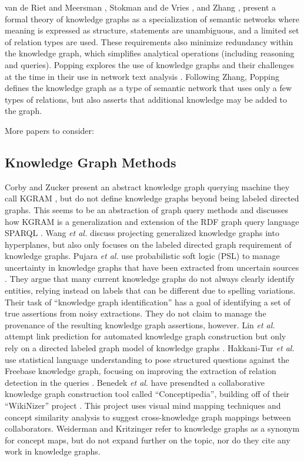 \documentclass[runningheads,a4paper]{llncs}
\begin{document}
van de Riet and Meersman \cite{van1992knowledge}, Stokman and de Vries \cite{Stokman_1988}, and Zhang \cite{zhang2002knowledge}, present a formal theory of knowledge graphs as a specialization of semantic networks where meaning is expressed as structure, statements are unambiguous, and a limited set of relation types are used.
These requirements also minimize redundancy within the knowledge graph, which simplifies analytical operations (including reasoning and queries).
Popping explores the use of knowledge graphs and their challenges at the time in their use in network text analysis \cite{Popping_2003}. 
Following Zhang, Popping defines the knowledge graph as a type of semantic network that uses only a few types of relations, but also asserts that additional knowledge may be added to the graph.

More papers to consider: \cite{Dieng_1992} \cite{Juel_Vang_2013}

\subsection{Knowledge Graph Methods}
Corby and Zucker present an abstract knowledge graph querying machine they call KGRAM \cite{Corby_2010}, but do not define knowledge graphs beyond being labeled directed graphs.
This seems to be an abstraction of graph query methods and discusses how KGRAM is a generalization and extension of the RDF graph query language SPARQL \cite{harris2013sparql}.
Wang \emph{et al.} \cite{Wang_knowledgegraph} discuss projecting generalized knowledge graphs into hyperplanes, but also only focuses on the labeled directed graph requirement of knowledge graphs.
Pujara \emph{et al.} use probabilistic soft logic (PSL) to manage uncertainty in knowledge graphs that have been extracted from uncertain sources \cite{Pujara_2013}. 
They argue that many current knowledge graphs do not always clearly identify entities, relying instead on labels that can be different due to spelling variations.
Their task of ``knowledge graph identification'' has a goal of identifying a set of true assertions from noisy extractions.
They do not claim to manage the provenance of the resulting knowledge graph assertions, however.
Lin \emph{et al.} attempt link prediction for automated knowledge graph construction but only rely on a directed labeled graph model of knowledge graphs \cite{lin2015learning}.
Hakkani-Tur \emph{et al.} use statistical language understanding to pose structured questions against the Freebase knowledge graph, focusing on improving the extraction of relation detection in the queries \cite{Hakkani_Tur_2013}.
Benedek \emph{et al.} have presendted a collaborative knowledge graph construction tool called  ``Conceptipedia'', building off of their ``WikiNizer'' project .
This project uses visual mind mapping techniques and concept similarity analysis to suggest cross-knowledge graph mappings between collaborators.
Weiderman and Kritzinger \cite{} refer to knowledge graphs as a synonym for concept maps, but do not expand further on the topic, nor do they cite any work in knowledge graphs.
 
\end{document}
